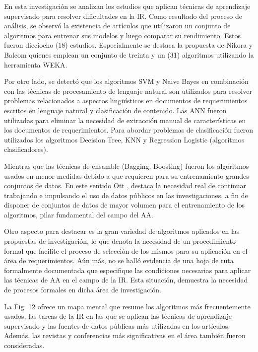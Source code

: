 \documentclass[journal]{IEEEtran}
\begin{document}
En esta investigación se analizan los estudios que aplican técnicas de aprendizaje supervisado para resolver dificultades en la IR. Como resultado del proceso de análisis, se observó la existencia de artículos que utilizaron un conjunto de algoritmos para entrenar sus modelos y luego comparar su rendimiento.
Estos fueron dieciocho (18) estudios. Especialmente se destaca la propuesta de Nikora y Balcom \cite{nikora2009automated} quienes emplean un conjunto de treinta y un (31) algoritmos utilizando la herramienta WEKA.

Por otro lado, se detectó que los algoritmos SVM y Naive Bayes en combinación con las técnicas de procesamiento de lenguaje natural son utilizados para resolver problemas relacionados a aspectos lingüísticos en documentos de requerimientos escritos en lenguaje natural y clasificación de contenido. Las ANN fueron utilizadas para eliminar la necesidad de extracción manual de características en los documentos de requerimientos. Para abordar problemas de clasificación fueron utilizados los algoritmos Decision Tree, KNN y Regression Logistic (algoritmos clasificadores).

Mientras que las técnicas de ensamble (Bagging, Boosting) fueron los algoritmos usados en menor medidas debido a que requieren para su entrenamiento grandes conjuntos de datos. En este sentido Ott \cite{Ott2013}, destaca la necesidad real de continuar trabajando e impulsando el uso de datos públicos en las investigaciones, a fin de disponer de conjuntos de datos de mayor volumen para el entrenamiento de los algoritmos, pilar fundamental del campo del AA. 

Otro aspecto para destacar es la gran variedad de algoritmos aplicados en las propuestas de investigación, lo que denota la necesidad de un procedimiento formal que facilite el proceso de selección de los mismos para su aplicación en el área de requerimientos.  Aún más, no se halló evidencia de una hoja de ruta formalmente documentada que especifique las condiciones necesarias para aplicar las técnicas de AA en el campo de la IR. Esta situación, demuestra la necesidad de procesos formales en dicha área de investigación.

La Fig. 12 ofrece un mapa mental que resume los algoritmos más frecuentemente usados, las tareas de la IR en las que se aplican las técnicas de aprendizaje supervisado y las fuentes de datos públicas más utilizadas en los artículos. Además, las revistas y conferencias más significativas en el área también fueron consideradas.
\end{document}
